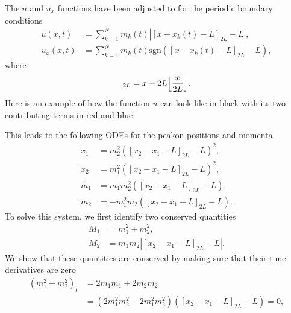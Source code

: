 \documentclass[english,master]{liumaiex}
\theoremstyle{plain}
\theoremstyle{definition}
\newcommand{\sgn}{\text{sgn}}
\DeclarePairedDelimiter\floor{\lfloor}{\rfloor}
\begin{document}
The $u$ and $u_x$ functions have been adjusted to for the periodic boundary conditions
\begin{equation}
\begin{aligned}
	u(x, t) &= \sum_{k = 1}^{N} m_k(t) |[x - x_k(t) - L]_{2L} - L|, \\
	u_x(x, t) &= \sum_{k = 1}^{N} m_k(t) \sgn([x - x_k(t) - L]_{2L} - L),
\end{aligned}
\end{equation}
where
\begin{equation}
	[x]_{2L} = x - 2L\floor*{\frac{x}{2L}}.
\end{equation}
%
Here is an example of how the function $u$ can look like in black with its two contributing terms in red and blue
\begin{center}
\end{center}
%
This leads to the following ODEs for the peakon positions and momenta
%
\begin{align}
	\dot{x}_1 & = m_2^2 ([x_2 - x_1 - L]_{2L} - L)^2, \\
	\dot{x}_2 & = m_1^2 ([x_2 - x_1 - L]_{2L} - L)^2, \\
	\dot{m}_1 & = m_1 m_2^2([x_2 - x_1 - L]_{2L} - L),  \\
	\dot{m}_2 & = -m_1^2 m_2([x_2 - x_1 - L]_{2L} - L).
\end{align}
%
To solve this system, we first identify two conserved quantities
\begin{align}
	M_1 &= m_1^2 + m_2^2, \\
	M_2 &= m_1m_2|[x_2 - x_1 - L]_{2L} - L|.
\end{align}
%
We show that these quantities are conserved by making sure that their time derivatives are zero
\begin{equation}
\begin{aligned}
	(m_1^2 + m_2^2)_t 
	&= 2m_1\dot{m}_1 + 2m_2\dot{m}_2 \\
	&= (2m_1^2m_2^2 - 2m_1^2m_2^2)([x_2 - x_1 - L]_{2L} - L) = 0,
\end{aligned}
\end{equation}
\end{document}
